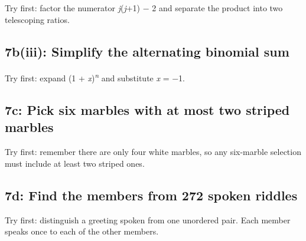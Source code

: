 \documentclass[11pt]{article}
\begin{document}
\begin{keepsection}
\begin{keepsection}
Try first: factor the numerator \textit{j}(\textit{j}+1) \ensuremath{-} 2 and separate the product into two telescoping ratios.

\end{keepsection}

\begin{keepsection}
\subsection{7b(iii): Simplify the alternating binomial sum}

Try first: expand (1 + \textit{x})\textsuperscript{\textit{n}} and substitute \textit{x} = \ensuremath{-}1.

\end{keepsection}

\begin{keepsection}
\subsection{7c: Pick six marbles with at most two striped marbles}

Try first: remember there are only four white marbles, so any six-marble selection must include at least two striped ones.

\end{keepsection}

\begin{keepsection}
\subsection{7d: Find the members from 272 spoken riddles}

Try first: distinguish a greeting spoken from one unordered pair. Each member speaks once to each of the other members.

\end{keepsection}
\end{keepsection}
\end{document}
